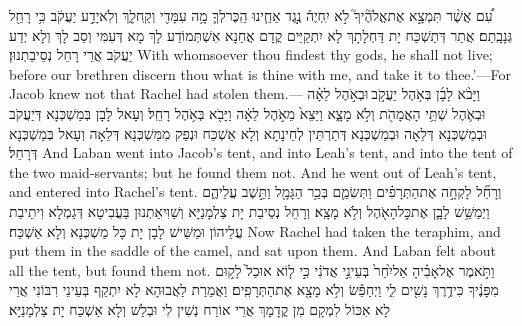 {עִ֠ם אֲשֶׁ֨ר תִּמְצָ֣א אֶת\maqqaf אֱלֹהֶ֘יךָ֮ לֹ֣א יִֽחְיֶה֒ נֶ֣גֶד אַחֵ֧ינוּ הַֽכֶּר\maqqaf לְךָ֛ מָ֥ה עִמָּדִ֖י וְקַֽח\maqqaf לָ֑ךְ וְלֹֽא\maqqaf יָדַ֣ע יַעֲקֹ֔ב כִּ֥י רָחֵ֖ל גְּנָבָֽתַם׃}
{אֲתַר דְּתַשְׁכַּח יָת דַּחְלָתָךְ לָא יִתְקַיַּים קֳדָם אֲחַנָא אִשְׁתְּמוֹדַע לָךְ מָא דְּעִמִּי וְסַב לָךְ וְלָא יְדַע יַעֲקֹב אֲרֵי רָחֵל נְסֵיבַתְנוּן׃}
{With whomsoever thou findest thy gods, he shall not live; before our brethren discern thou what is thine with me, and take it to thee.’—For Jacob knew not that Rachel had stolen them.—}{}
{וַיָּבֹ֨א לָבָ֜ן בְּאֹ֥הֶל יַעֲקֹ֣ב \legarmeh  וּבְאֹ֣הֶל לֵאָ֗ה וּבְאֹ֛הֶל שְׁתֵּ֥י הָאֲמָהֹ֖ת וְלֹ֣א מָצָ֑א וַיֵּצֵא֙ מֵאֹ֣הֶל לֵאָ֔ה וַיָּבֹ֖א בְּאֹ֥הֶל רָחֵֽל׃}
{וְעָאל לָבָן בְּמַשְׁכְּנָא דְּיַעֲקֹב וּבְמַשְׁכְּנָא דְּלֵאָה וּבְמַשְׁכְּנָא דְּתַרְתֵּין לְחֵינָתָא וְלָא אַשְׁכַּח וּנְפַק מִמַּשְׁכְּנָא דְּלֵאָה וְעָאל בְּמַשְׁכְּנָא דְּרָחֵל׃}
{And Laban went into Jacob’s tent, and into Leah’s tent, and into the tent of the two maid-servants; but he found them not. And he went out of Leah’s tent, and entered into Rachel’s tent.}{}
{וְרָחֵ֞ל לָקְחָ֣ה אֶת\maqqaf הַתְּרָפִ֗ים וַתְּשִׂמֵ֛ם בְּכַ֥ר הַגָּמָ֖ל וַתֵּ֣שֶׁב עֲלֵיהֶ֑ם וַיְמַשֵּׁ֥שׁ לָבָ֛ן אֶת\maqqaf כׇּל\maqqaf הָאֹ֖הֶל וְלֹ֥א מָצָֽא׃}
{וְרָחֵל נְסֵיבַת יָת צַלְמָנַיָּא וְשַׁוִּיאַתְנוּן בַּעֲבִיטָא דְּגַמְלָא וִיתֵיבַת עֲלֵיהוֹן וּמַשֵּׁישׁ לָבָן יָת כָּל מַשְׁכְּנָא וְלָא אַשְׁכַּח׃}
{Now Rachel had taken the teraphim, and put them in the saddle of the camel, and sat upon them. And Laban felt about all the tent, but found them not.}{}
{וַתֹּ֣אמֶר אֶל\maqqaf אָבִ֗יהָ אַל\maqqaf יִ֙חַר֙ בְּעֵינֵ֣י אֲדֹנִ֔י כִּ֣י ל֤וֹא אוּכַל֙ לָק֣וּם מִפָּנֶ֔יךָ כִּי\maqqaf דֶ֥רֶךְ נָשִׁ֖ים לִ֑י וַיְחַפֵּ֕שׂ וְלֹ֥א מָצָ֖א אֶת\maqqaf הַתְּרָפִֽים׃}
{וַאֲמַרַת לַאֲבוּהָא לָא יִתְקַף בְּעֵינֵי רִבּוֹנִי אֲרֵי לָא אִכּוֹל לִמְקָם מִן קֳדָמָךְ אֲרֵי אוֹרַח נְשִׁין לִי וּבְלַשׁ וְלָא אַשְׁכַּח יָת צַלְמָנַיָּא׃}
